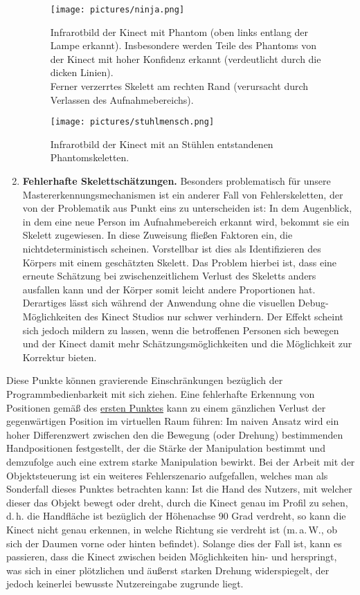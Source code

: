 \begin{enumerate}[label=(\roman*)]
	\begin{figure}
	\centering
	\texttt{[image: pictures/ninja.png]}
	\caption{Infrarotbild der Kinect mit Phantom (oben links entlang der Lampe erkannt). Insbesondere werden Teile des Phantoms von der Kinect mit hoher Konfidenz erkannt (verdeutlicht durch die dicken Linien).\\
	Ferner verzerrtes Skelett am rechten Rand (verursacht durch Verlassen des Aufnahmebereichs).}\label{fig:ninja}
	\end{figure}\par
	\begin{figure}
	\centering
	\texttt{[image: pictures/stuhlmensch.png]}
	\caption{Infrarotbild der Kinect mit an Stühlen entstandenen Phantomskeletten.}\label{fig:stuhlmensch}
	\end{figure}
	\item\label{itm:problem5} \textbf{Fehlerhafte Skelettschätzungen.} Besonders problematisch für unsere Mastererkennungsmechanismen ist ein anderer Fall von Fehlerskeletten, der von der Problematik aus Punkt eins zu unterscheiden ist: In dem Augenblick, in dem eine neue Person im Aufnahmebereich erkannt wird, bekommt sie ein Skelett zugewiesen. In diese Zuweisung fließen Faktoren ein, die nichtdeterministisch scheinen. Vorstellbar ist dies als Identifizieren des Körpers mit einem geschätzten Skelett. Das Problem hierbei ist, dass eine erneute Schätzung bei zwischenzeitlichem Verlust des Skeletts anders ausfallen kann und der Körper somit leicht andere Proportionen hat. Derartiges lässt sich während der Anwendung ohne die visuellen Debug-Möglichkeiten des Kinect Studios nur schwer verhindern. Der Effekt scheint sich jedoch mildern zu lassen, wenn die betroffenen Personen sich bewegen und der Kinect damit mehr Schätzungsmöglichkeiten und die Möglichkeit zur Korrektur bieten.\par
	\end{enumerate}
	Diese Punkte können gravierende Einschränkungen bezüglich der Programmbedienbarkeit mit sich ziehen. Eine fehlerhafte Erkennung von Positionen gemäß des \hyperref[itm:problem1]{ersten Punktes} kann zu einem gänzlichen Verlust der gegenwärtigen Position im virtuellen Raum führen: Im naiven Ansatz wird ein hoher Differenzwert zwischen den die Bewegung (oder Drehung) bestimmenden Handpositionen festgestellt, der die Stärke der Manipulation bestimmt und demzufolge auch eine extrem starke Manipulation bewirkt. Bei der Arbeit mit der Objektsteuerung ist ein weiteres Fehlerszenario aufgefallen, welches man als Sonderfall dieses Punktes betrachten kann: Ist die Hand des Nutzers, mit welcher dieser das Objekt bewegt oder dreht, durch die Kinect genau im Profil zu sehen, d.\,h. die Handfläche ist bezüglich der Höhenachse 90 Grad verdreht, so kann die Kinect nicht genau erkennen, in welche Richtung sie verdreht ist (m.\,a.\,W., ob sich der Daumen vorne oder hinten befindet). Solange dies der Fall ist, kann es passieren, dass die Kinect zwischen beiden Möglichkeiten hin- und herspringt, was sich in einer plötzlichen und äußerst starken Drehung widerspiegelt, der jedoch keinerlei bewusste Nutzereingabe zugrunde liegt.\par 
